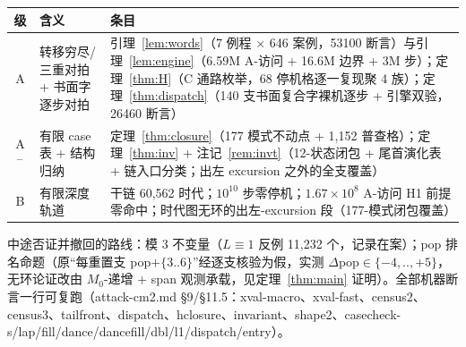 \documentclass[11pt]{ctexart}
\theoremstyle{definition}
\begin{document}
\begin{center}\small
\begin{tabular}{clp{9.2cm}}
\toprule
级 & 含义 & 条目\\
\midrule
A & 转移穷尽/三重对拍 + 书面字逐步对拍 & 引理~\ref{lem:words}（7 例程 × 646 案例，53100 断言）与引理~\ref{lem:engine}（6.59M A-访问 + 16.6M 边界 + 3M 步）；定理~\ref{thm:H}（C 通路枚举，68 停机格逐一复现聚 4 族）；定理~\ref{thm:dispatch}（140 支书面复合字裸机逐步 + 引擎双验，26460 断言）\\
A$^-$ & 有限 case 表 + 结构归纳 & 定理~\ref{thm:closure}（177 模式不动点 + 1{,}152 普查格）；定理~\ref{thm:inv} + 注记~\ref{rem:invt}（12-状态闭包 + 尾首演化表 + 链入口分类；出左 excursion 之外的全支覆盖）\\
B & 有限深度轨道 & 干链 60{,}562 时代；$10^{10}$ 步零停机；$1.67\times10^8$ A-访问 H1 前提零命中；时代图无环的出左-excursion 段（177-模式闭包覆盖）\\
\bottomrule
\end{tabular}
\end{center}

\noindent 中途否证并撤回的路线：模 3 不变量（$L\equiv 1$ 反例 11{,}232 个，记录在案）；pop 排名命题（原``每重置支 pop$+\{3..6\}$''经逐支核验为假，实测 $\Delta$pop$\in\{-4,..,+5\}$，无环论证改由 $M_0$-递增 + span 观测承载，见定理~\ref{thm:main} 证明）。全部机器断言一行可复跑（attack-cm2.md §9/§11.5：xval-macro、xval-fast、census2、census3、tailfront、dispatch、hclosure、invariant、shape2、casecheck-s/lap/fill/dance/dancefill/dbl/l1/dispatch/entry）。
\end{document}
